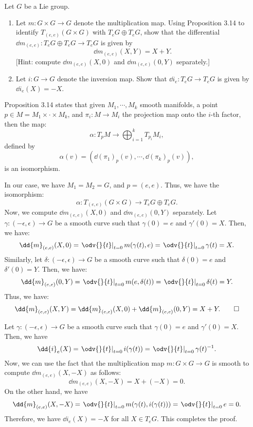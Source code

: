 \renewcommand\S{\mathbb{S}}

\begin{problem}[1]
  Let $G$ be a Lie group.
  \begin{enumerate}
    \item Let $m : G \times G \to G$ denote the multiplication map. Using Proposition 3.14 to identify $T_{(e,e)}(G \times G)$ with $T_eG \oplus T_eG$, show that the differential $\dd{m}_{(e,e)} : T_eG \oplus T_eG \to T_eG$ is given by
      \[%
        \dd{m}_{(e,e)}(X,Y) = X + Y
      .\]%
      [Hint: compute $\dd{m}_{(e,e)}(X, 0)$ and $\dd{m}_{(e,e)}(0, Y)$ separately.]
    \item Let $i : G \to G$ denote the inversion map. Show that $\dd{i}_e : T_eG \to T_eG$ is given by $\dd{i}_e(X) = -X$.
  \end{enumerate}
\end{problem}

\begin{solution}[(i)]
  Proposition 3.14 states that given $M_1, \cdots, M_k$ smooth manifolds, a point $p \in M = M_1 \times \cdot \times M_k$, and $\pi_i : M \to M_i$ the projection map onto the $i$-th factor, then the map:
  \[%
    \alpha : T_pM \to \bigoplus_{i=1}^k T_{p_i}M_i
  ,\]%
  defined by
  \[%
    \alpha(v) = (\dd{(\pi_1)}_p(v), \cdots, \dd{(\pi_k)}_p(v))
  ,\]%
  is an isomorphism.

  In our case, we have $M_1 = M_2 = G$, and $p = (e, e)$. Thus, we have the isomorphism:
  \[%
    \alpha : T_{(e,e)}(G \times G) \to T_eG \oplus T_eG
  .\]%
  Now, we compute $\dd{m}_{(e,e)}(X, 0)$ and $\dd{m}_{(e,e)}(0, Y)$ separately. Let $\gamma : (-\epsilon, \epsilon) \to G$ be a smooth curve such that $\gamma(0) = e$ and $\gamma'(0) = X$. Then, we have:
  \[%
    \dd{m}_{(e,e)}(X, 0) = \left.\odv{}{t}\right\rvert_{t=0} m(\gamma(t), e) = \left.\odv{}{t}\right\rvert_{t=0} \gamma(t) = X
  .\]%
  Similarly, let $\delta : (-\epsilon, \epsilon) \to G$ be a smooth curve such that $\delta(0) = e$ and $\delta'(0) = Y$. Then, we have:
  \[%
    \dd{m}_{(e,e)}(0, Y) = \left.\odv{}{t}\right\rvert_{t=0} m(e, \delta(t)) = \left.\odv{}{t}\right\rvert_{t=0} \delta(t) = Y
  .\]%
  Thus, we have:
  \[%
    \dd{m}_{(e,e)}(X, Y) = \dd{m}_{(e,e)}(X, 0) + \dd{m}_{(e,e)}(0, Y) = X + Y
  .\qedhere\]%
\end{solution}

\begin{solution}[(ii)]
  Let $\gamma : (-\epsilon, \epsilon) \to G$ be a smooth curve such that $\gamma(0) = e$ and $\gamma'(0) = X$. Then, we have
  \[%
    \dd{i}_e(X) = \left.\odv{}{t}\right\rvert_{t=0} i(\gamma(t)) = \left.\odv{}{t}\right\rvert_{t=0} \gamma(t)^{-1}
  .\]%
  Now, we can use the fact that the multiplication map $m : G \times G \to G$ is smooth to compute $\dd{m}_{(e,e)}(X, -X)$ as follows:
  \[%
    \dd{m}_{(e,e)}(X, -X) = X + (-X) = 0
  .\]%
  On the other hand, we have
  \[%
    \dd{m}_{(e,e)}(X, -X) = \left.\odv{}{t}\right\rvert_{t=0} m(\gamma(t), i(\gamma(t))) = \left.\odv{}{t}\right\rvert_{t=0} e = 0
  .\]%
  Therefore, we have $\dd{i}_e(X) = -X$ for all $X \in T_eG$. This completes the proof.
\end{solution}

